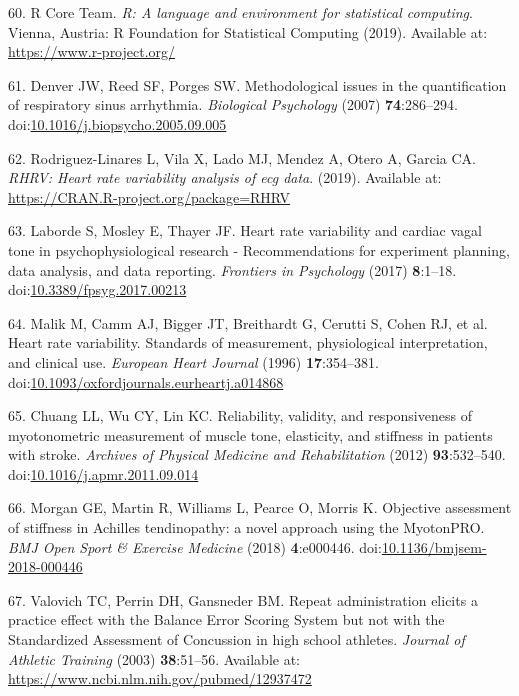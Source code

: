 \documentclass[
  english,
  man]{apa6}
\newenvironment{cslreferences}%
  {}%
  {\par}
\begin{document}
\begin{cslreferences}
\leavevmode\hypertarget{ref-RCoreTeam2019}{}%
60. R Core Team. \emph{R: A language and environment for statistical computing}. Vienna, Austria: R Foundation for Statistical Computing (2019). Available at: \url{https://www.r-project.org/}

\leavevmode\hypertarget{ref-Denver2007}{}%
61. Denver JW, Reed SF, Porges SW. Methodological issues in the quantification of respiratory sinus arrhythmia. \emph{Biological Psychology} (2007) \textbf{74}:286--294. doi:\href{https://doi.org/10.1016/j.biopsycho.2005.09.005}{10.1016/j.biopsycho.2005.09.005}

\leavevmode\hypertarget{ref-Rodriguez-Linares2017}{}%
62. Rodriguez-Linares L, Vila X, Lado MJ, Mendez A, Otero A, Garcia CA. \emph{RHRV: Heart rate variability analysis of ecg data}. (2019). Available at: \url{https://CRAN.R-project.org/package=RHRV}

\leavevmode\hypertarget{ref-Laborde2017}{}%
63. Laborde S, Mosley E, Thayer JF. Heart rate variability and cardiac vagal tone in psychophysiological research - Recommendations for experiment planning, data analysis, and data reporting. \emph{Frontiers in Psychology} (2017) \textbf{8}:1--18. doi:\href{https://doi.org/10.3389/fpsyg.2017.00213}{10.3389/fpsyg.2017.00213}

\leavevmode\hypertarget{ref-Malik1996}{}%
64. Malik M, Camm AJ, Bigger JT, Breithardt G, Cerutti S, Cohen RJ, et al. Heart rate variability. Standards of measurement, physiological interpretation, and clinical use. \emph{European Heart Journal} (1996) \textbf{17}:354--381. doi:\href{https://doi.org/10.1093/oxfordjournals.eurheartj.a014868}{10.1093/oxfordjournals.eurheartj.a014868}

\leavevmode\hypertarget{ref-Chuang2012}{}%
65. Chuang LL, Wu CY, Lin KC. Reliability, validity, and responsiveness of myotonometric measurement of muscle tone, elasticity, and stiffness in patients with stroke. \emph{Archives of Physical Medicine and Rehabilitation} (2012) \textbf{93}:532--540. doi:\href{https://doi.org/10.1016/j.apmr.2011.09.014}{10.1016/j.apmr.2011.09.014}

\leavevmode\hypertarget{ref-Morgan2018}{}%
66. Morgan GE, Martin R, Williams L, Pearce O, Morris K. Objective assessment of stiffness in Achilles tendinopathy: a novel approach using the MyotonPRO. \emph{BMJ Open Sport \& Exercise Medicine} (2018) \textbf{4}:e000446. doi:\href{https://doi.org/10.1136/bmjsem-2018-000446}{10.1136/bmjsem-2018-000446}

\leavevmode\hypertarget{ref-Valovich2003}{}%
67. Valovich TC, Perrin DH, Gansneder BM. Repeat administration elicits a practice effect with the Balance Error Scoring System but not with the Standardized Assessment of Concussion in high school athletes. \emph{Journal of Athletic Training} (2003) \textbf{38}:51--56. Available at: \url{https://www.ncbi.nlm.nih.gov/pubmed/12937472}


\end{cslreferences}
\end{document}

